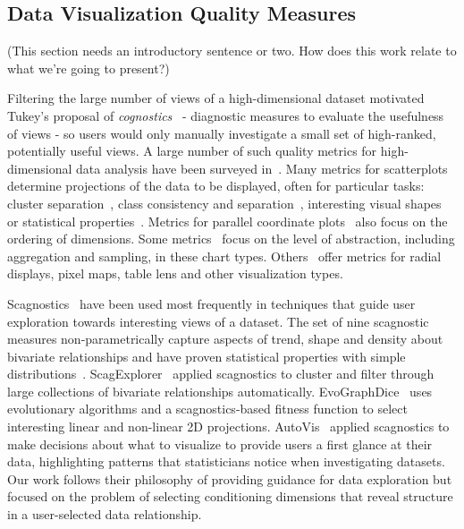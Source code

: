 
\subsection{Data Visualization Quality Measures}
(This section needs an introductory sentence or two. How does this work relate to what we're going to present?)

Filtering the large number of views of a high-dimensional dataset motivated Tukey's proposal of \textit{cognostics}~\cite{Tukey1982,Tukey1985} - diagnostic measures to evaluate the usefulness of views - so users would only manually investigate a small set of high-ranked, potentially useful views. A large number of such quality metrics for high-dimensional data analysis have been surveyed in~\cite{Bertini2011}.  Many metrics for scatterplots determine projections of the data to be displayed, often for particular tasks: cluster separation~\cite{Sedlmair2012, Tatu2009}, class consistency and separation~\cite{Sips2009, Schafer2013}, interesting visual shapes~\cite{Wilkinson2005} or statistical properties~\cite{Kandel2012, Seo2005, Piringer2008}. Metrics for parallel coordinate plots~\cite{Ankerst1998, Dasgupta2010, Johansson2009, Yang2003} also focus on the ordering of dimensions. Some metrics~\cite{Bertini2006, Cui2006} focus on the level of abstraction, including aggregation and sampling, in these chart types. Others~\cite{Albuquerque2010, Ankerst1998, Schneidewind2006, Yang2003} offer metrics for radial displays, pixel maps, table lens and other visualization types. 
	
Scagnostics~\cite{Wilkinson2005} have been used most frequently in techniques that guide user exploration towards interesting views of a dataset. The set of nine scagnostic measures non-parametrically capture aspects of trend, shape and density about bivariate relationships and have proven statistical properties with simple distributions~\cite{Wilkinson2008}. ScagExplorer~\cite{Dang2014} applied scagnostics to cluster and filter through large collections of bivariate relationships automatically. EvoGraphDice~\cite{Boukhelifa2013} uses evolutionary algorithms and a scagnostics-based fitness function to select interesting linear and non-linear 2D projections. AutoVis~\cite{Wills2010} applied scagnostics to make decisions about what to visualize to provide users a first glance at their data, highlighting patterns that statisticians notice when investigating datasets. Our work follows their philosophy of providing guidance for data exploration but focused on the problem of selecting conditioning dimensions that reveal structure in a user-selected data relationship. 

